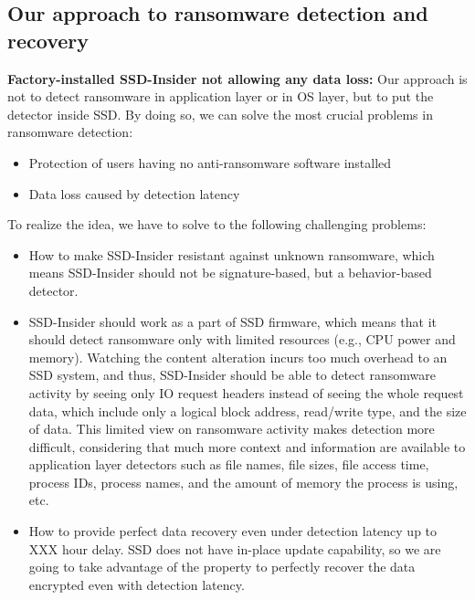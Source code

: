 \documentclass[conference]{IEEEtran}
\newcommand{\eg}{e.g.,\xspace}
\newcommand{\ours}{SSD-Insider}
\begin{document}
\subsection{Our approach to ransomware detection and recovery}
{\noindent\bf Factory-installed \ours{} not allowing any data loss:} 
Our approach is not to detect ransomware in application layer or in OS layer, 
but to put the detector inside SSD. By doing so, we can solve the most crucial problems 
in ransomware detection: 
\begin{itemize}
    \item Protection of users having no anti-ransomware software installed
    \item Data loss caused by detection latency
\end{itemize}

To realize the idea, we have to solve to the following challenging problems:
\begin{itemize}
    \item How to make \ours{} resistant against unknown ransomware, which means \ours{} should not be signature-based,
    but a behavior-based detector.
    \item \ours{} should work as a part of SSD firmware, which means that it should
    detect ransomware only with limited resources (\eg CPU power and memory). 
    Watching the content alteration incurs too much overhead to an SSD system,
    and thus, \ours{} should be able to detect ransomware activity 
    by seeing only IO request headers instead of seeing the whole request data, 
    which include only a logical block address, read/write type, and the size of data. 
    This limited view on ransomware activity makes detection more difficult,
    considering that much more context and information are available to application layer detectors 
    such as file names, file sizes, file access time, process IDs, process names, and the amount of memory 
    the process is using, etc. 
    \item How to provide perfect data recovery even under detection latency up to XXX hour delay. 
    SSD does not have in-place update capability, so we are going to take advantage of the property
    to perfectly recover the data encrypted even with detection latency.
\end{itemize}
\end{document}

